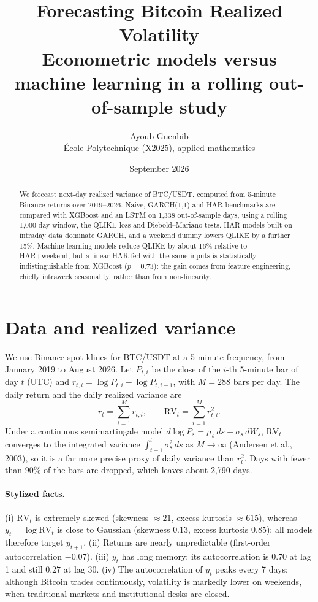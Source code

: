 \documentclass[11pt,a4paper]{article}
\title{\textbf{Forecasting Bitcoin Realized Volatility}\\[0.3em]
\large Econometric models versus machine learning in a rolling out-of-sample study}
\author{Ayoub Guenbib\\ \small École Polytechnique (X2025), applied mathematics}
\date{September 2026}
\newcommand{\RV}{\mathrm{RV}}
\begin{document}
\maketitle

\begin{abstract}
\sloppy\noindent We forecast next-day realized variance of BTC/\allowbreak USDT, computed from 5-minute Binance returns over 2019--2026.
Naive, GARCH(1,1) and HAR benchmarks are compared with XGBoost and an LSTM on 1{,}338 out-of-sample days,
using a rolling 1{,}000-day window, the QLIKE loss and Diebold--Mariano tests. HAR models built on intraday
data dominate GARCH, and a weekend dummy lowers QLIKE by a further 15\%. Machine-learning models reduce QLIKE by about
16\% relative to HAR+weekend, but a linear HAR fed with the same inputs is statistically indistinguishable
from XGBoost ($p=0.73$): the gain comes from feature engineering, chiefly intraweek seasonality, rather than from non-linearity.
\end{abstract}

\section{Data and realized variance}

We use Binance spot klines for BTC/\allowbreak USDT at a 5-minute frequency, from January 2019 to August 2026.
Let $P_{t,i}$ be the close of the $i$-th 5-minute bar of day $t$ (UTC) and $r_{t,i}=\log P_{t,i}-\log P_{t,i-1}$, with $M=288$ bars per day.
The daily return and the daily realized variance are
\begin{equation}
r_t=\sum_{i=1}^{M} r_{t,i}, \qquad \RV_t=\sum_{i=1}^{M} r_{t,i}^2 .
\end{equation}
Under a continuous semimartingale model $d\log P_s=\mu_s\,ds+\sigma_s\,dW_s$, $\RV_t$ converges to the integrated variance
$\int_{t-1}^{t}\sigma_s^2\,ds$ as $M\to\infty$ (Andersen et al., 2003), so it is a far more precise proxy of daily variance than
$r_t^2$. Days with fewer than $90\%$ of the bars are dropped, which leaves about 2{,}790 days.

\paragraph{Stylized facts.}
(i) $\RV_t$ is extremely skewed (skewness $\approx 21$, excess kurtosis $\approx 615$), whereas $y_t=\log\RV_t$ is close to Gaussian
(skewness $0.13$, excess kurtosis $0.85$); all models therefore target $y_{t+1}$.
(ii) Returns are nearly unpredictable (first-order autocorrelation $-0.07$).
(iii) $y_t$ has long memory: its autocorrelation is $0.70$ at lag 1 and still $0.27$ at lag 30.
(iv) The autocorrelation of $y_t$ peaks every 7 days: although Bitcoin trades continuously, volatility is markedly lower on weekends,
when traditional markets and institutional desks are closed.
\end{document}
